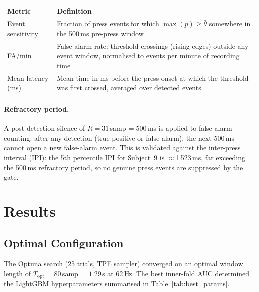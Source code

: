 \documentclass[12pt,a4paper]{article}
\begin{document}
\begin{center}
\begin{tabular}{lp{9cm}}
\toprule
Metric & Definition \\
\midrule
Event sensitivity & Fraction of press events for which $\max(p) \geq \bar{\theta}$ somewhere in the 500\,ms pre-press window \\
FA/min & False alarm rate: threshold crossings (rising edges) outside any event window, normalised to events per minute of recording time \\
Mean latency (ms) & Mean time in ms before the press onset at which the threshold was first crossed, averaged over detected events \\
\bottomrule
\end{tabular}
\end{center}

\paragraph{Refractory period.} A post-detection silence of
$R = 31$\,samp\,$= 500$\,ms is applied to false-alarm counting: after any
detection (true positive or false alarm), the next 500\,ms cannot open a new
false-alarm event. This is validated against the inter-press interval (IPI):
the 5th percentile IPI for Subject~9 is $\approx$1\,523\,ms, far exceeding
the 500\,ms refractory period, so no genuine press events are suppressed by
the gate.

\section{Results}

\subsection{Optimal Configuration}

The Optuna search (25 trials, TPE sampler) converged on an optimal window
length of $T_{\text{opt}} = 80$\,samp\,$= 1.29$\,s at 62\,Hz. The best
inner-fold AUC determined the LightGBM hyperparameters summarised in
Table~\ref{tab:best_params}.
\end{document}
